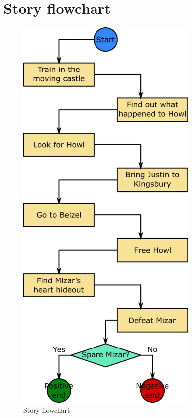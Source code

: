 \section{Story flowchart}

\begin{figure}[H]
  \centering
  \includegraphics[width=\textwidth,height=20cm,keepaspectratio]{Images/Diagrams/storyFlowchart}
  \caption{Story flowchart}
\end{figure}
